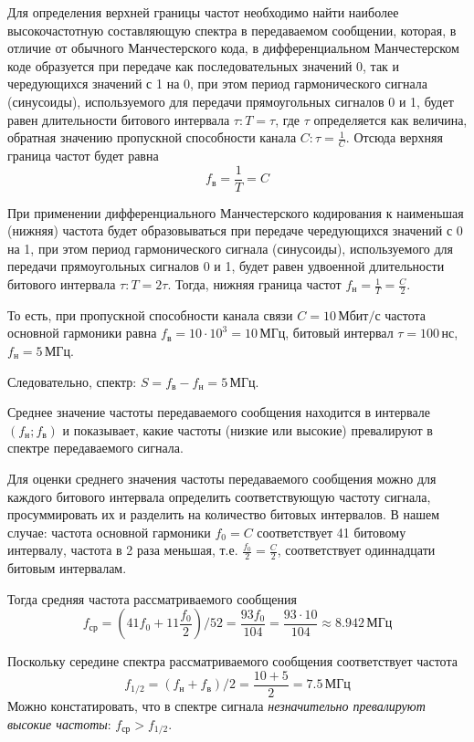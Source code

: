 Для определения верхней границы частот необходимо найти наиболее высокочастотную составляющую спектра в передаваемом сообщении, которая, в отличие от обычного Манчестерского кода, в дифференциальном Манчестерском коде образуется при передаче как последовательных значений 0, так и чередующихся значений с 1 на 0, при этом период гармонического сигнала (синусоиды), используемого для передачи прямоугольных сигналов 0 и 1, будет равен длительности битового интервала $\tau: T = \tau$, где $\tau$ определяется как величина, обратная значению пропускной способности канала $C: \tau = \frac{1}{C}$. Отсюда верхняя граница частот будет равна \[f_{\text{в}} = \frac{1}{T} = C\]

При применении дифференциального Манчестерского кодирования к наименьшая (нижняя) частота будет образовываться при передаче чередующихся значений с 0 на 1, при этом период гармонического сигнала (синусоиды), используемого для передачи прямоугольных сигналов 0 и 1, будет равен удвоенной длительности битового интервала $\tau: T = 2\tau$. Тогда, нижняя граница частот $f_{\text{н}} = \frac{1}{T} = \frac{C}{2}$.

То есть, при пропускной способности канала связи $C = 10 \, \text{Мбит/с}$ частота основной гармоники равна $f_{\text{в}} = 10 \cdot 10^3 = 10 \, \text{МГц}$, битовый интервал $\tau = 100 \, \text{нс}$, $f_{\text{н}} = 5 \, \text{МГц}$.

Следовательно, спектр: $S = f_{\text{в}} - f_{\text{н}} = 5 \, \text{МГц}$.

Среднее значение частоты передаваемого сообщения находится в интервале $(f_{\text{н}};f_{\text{в}})$ и показывает, какие частоты (низкие или высокие) превалируют в спектре передаваемого сигнала.

Для оценки среднего значения частоты передаваемого сообщения можно для каждого битового интервала определить соответствующую частоту сигнала, просуммировать их и разделить на количество битовых интервалов. В нашем случае: частота основной гармоники $f_0 = C$ соответствует 41 битовому интервалу, частота в 2 раза меньшая, т.е. $\frac{f_0}{2} = \frac{C}{2}$, соответствует одиннадцати битовым интервалам.

Тогда средняя частота рассматриваемого сообщения
\[
	f_{\text{ср}} = \left(41f_0+11\frac{f_0}{2}\right)/ 52 = \frac{93f_0}{104} = \frac{93 \cdot 10}{104} \approx 8.942 \, \text{МГц}
\]

Поскольку середине спектра рассматриваемого сообщения соответствует частота
\[
	f_{1/2} = (f_{\text{н}} + f_{\text{в}}) /2 = \frac{10 + 5}{2} = 7.5 \, \text{МГц}
\]
Можно констатировать, что в спектре сигнала \textit{незначительно превалируют высокие частоты}: $f_{\text{ср}} > f_{1/2}$.

